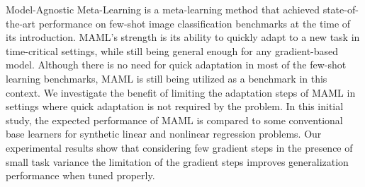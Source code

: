 Model-Agnostic Meta-Learning is a meta-learning method that achieved state-of-the-art performance on few-shot image classification benchmarks at the time of its introduction. MAML's strength is its ability to quickly adapt to a new task in time-critical settings, while still being general enough for any gradient-based model. Although there is no need for quick adaptation in most of the few-shot learning benchmarks, MAML is still being utilized as a benchmark in this context. We investigate the benefit of limiting the adaptation steps of MAML in settings where quick adaptation is not required by the problem. In this initial study, the expected performance of MAML is compared to some conventional base learners for synthetic linear and nonlinear regression problems. Our experimental results show that considering few gradient steps in the presence of small task variance the limitation of the gradient steps improves generalization performance when tuned properly.

